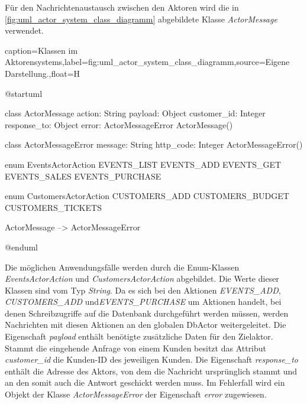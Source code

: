 Für den Nachrichtenaustausch zwischen den Aktoren wird die in \autoref{fig:uml_actor_system_class_diagramm} abgebildete Klasse \textit{ActorMessage} verwendet.

\begin{dhbwfigure}{caption=Klassen im Aktorensystems,label=fig:uml_actor_system_class_diagramm,source={Eigene Darstellung.},float=H}
    \begin{plantuml}
        @startuml

        class ActorMessage {
            action: String
            payload: Object 
            customer_id: Integer
            response_to: Object
            error: ActorMessageError
            ActorMessage()
        }

        class ActorMessageError {
            message: String
            http_code: Integer 
            ActorMessageError()
        }

        enum EventsActorAction {
            EVENTS_LIST
            EVENTS_ADD
            EVENTS_GET
            EVENTS_SALES
            EVENTS_PURCHASE
        }

        enum CustomersActorAction {
            CUSTOMERS_ADD
            CUSTOMERS_BUDGET
            CUSTOMERS_TICKETS
        }

        ActorMessage --> ActorMessageError

        @enduml
    \end{plantuml}
\end{dhbwfigure}\unskip

Die möglichen Anwendungsfälle werden durch die Enum-Klassen \textit{EventsActorAction} und \textit{CustomersActorAction} abgebildet.
Die Werte dieser Klassen sind vom Typ \textit{String}.
Da es sich bei den Aktionen \textit{EVENTS\_ADD}, \textit{CUSTOMERS\_ADD} und\newline \textit{EVENTS\_PURCHASE} um Aktionen handelt, bei denen Schreibzugriffe auf die Datenbank durchgeführt werden müssen, werden Nachrichten mit diesen Aktionen an den globalen DbActor weitergeleitet.
Die Eigenschaft \textit{payload} enthält benötigte zusätzliche Daten für den Zielaktor.
Stammt die eingehende Anfrage von einem Kunden besitzt das Attribut \textit{customer\_id} die Kunden-ID des jeweiligen Kunden.
Die Eigenschaft \textit{response\_to} enthält die Adresse des Aktors, von dem die Nachricht ursprünglich stammt und an den somit auch die Antwort geschickt werden muss.
Im Fehlerfall wird ein Objekt der Klasse \textit{ActorMessageError} der Eigenschaft \textit{error} zugewiesen.
